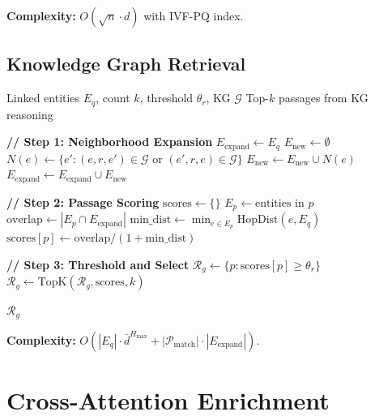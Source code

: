 \documentclass[11pt]{article}
\begin{document}
\textbf{Complexity:} $O(\sqrt{n} \cdot d)$ with IVF-PQ index.

\subsection{Knowledge Graph Retrieval}

\begin{algorithm}[H]
\caption{KGRetrieval}
\label{alg:kg}
\begin{algorithmic}[1]
\REQUIRE Linked entities $E_q$, count $k$, threshold $\theta_r$, KG $\mathcal{G}$
\ENSURE Top-$k$ passages from KG reasoning

\STATE \textbf{// Step 1: Neighborhood Expansion}
\STATE $E_{\text{expand}} \leftarrow E_q$
 
    \STATE $E_{\text{new}} \leftarrow \emptyset$
        \STATE $N(e) \leftarrow \{e' : (e, r, e') \in \mathcal{G} \text{ or } (e', r, e) \in \mathcal{G}\}$
        \STATE $E_{\text{new}} \leftarrow E_{\text{new}} \cup N(e)$
    \ENDFOR
    \STATE $E_{\text{expand}} \leftarrow E_{\text{expand}} \cup E_{\text{new}}$
\ENDFOR

\STATE
\STATE \textbf{// Step 2: Passage Scoring}
\STATE $\text{scores} \leftarrow \{\}$
    \STATE $E_p \leftarrow \text{entities in } p$
    \STATE $\text{overlap} \leftarrow |E_p \cap E_{\text{expand}}|$
    \STATE $\text{min\_dist} \leftarrow \min_{e \in E_p} \text{HopDist}(e, E_q)$
    \STATE $\text{scores}[p] \leftarrow \text{overlap} / (1 + \text{min\_dist})$ 
\ENDFOR

\STATE
\STATE \textbf{// Step 3: Threshold and Select}
\STATE $\mathcal{R}_g \leftarrow \{p : \text{scores}[p] \geq \theta_r\}$
\STATE $\mathcal{R}_g \leftarrow \text{TopK}(\mathcal{R}_g, \text{scores}, k)$

\RETURN $\mathcal{R}_g$
\end{algorithmic}
\end{algorithm}

\textbf{Complexity:} $O(|E_q| \cdot \bar{d}^{H_{\max}} + |\mathcal{P}_{\text{match}}| \cdot |E_{\text{expand}}|)$.

\section{Cross-Attention Enrichment}
\end{document}
